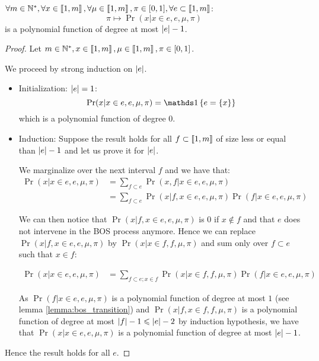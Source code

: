 \begin{lemma}
    \label{lemma:bos_polynomial}
    $\forall m \in \mathbb{N}^*, \forall x \in \left\llbracket1, m\right\rrbracket, \forall \mu \in \left\llbracket1, m\right\rrbracket, \pi \in [0, 1], \forall e \subset \left\llbracket1, m\right\rrbracket$:
    \[ \pi \mapsto \Pr(x | x \in e, e, \mu, \pi)\] 
    is a polynomial function of degree at most $\left|e\right| - 1$.
\end{lemma}
\begin{proof}
    Let $m \in \mathbb{N}^*, x \in \left\llbracket1, m\right\rrbracket, \mu \in \left\llbracket1, m\right\rrbracket, \pi \in [0, 1]$.

    We proceed by strong induction on $\left|e\right|$.
    \begin{itemize}
        \item Initialization: $\left|e\right| = 1$:
        \[ \Pr(x | x \in e, e, \mu, \pi) = \indickronecker{e = \set{x}} \] which is a polynomial function of degree $0$.
        
        \item Induction: Suppose the result holds for all $f \subset \left\llbracket1, m\right\rrbracket$ of size less or equal than $\left|e\right| - 1$ and let us prove it for $\left|e\right|$.
        
        We marginalize over the next interval $f$ and we have that:
        \begin{align}
            \Pr(x | x \in e, e, \mu, \pi) 
            &= \sum_{f \subset e} \Pr(x, f | x \in e, e, \mu, \pi) \\
            &= \sum_{f \subset e} \Pr(x | f, x \in e, e, \mu, \pi) \Pr(f | x \in e, e, \mu, \pi)
        \end{align}

        We can then notice that $\Pr(x | f, x \in e, e, \mu, \pi)$ is $0$ if $x \notin f$ and that $e$ does not intervene in the BOS process anymore. Hence we can replace $\Pr(x | f, x \in e, e, \mu, \pi)$ by $\Pr(x | x \in f, f, \mu, \pi)$ and sum only over $f \subset e$ such that $x \in f$:

        \begin{align}
            \Pr(x | x \in e, e, \mu, \pi) 
            &= \sum_{f \subset e ; x \in f} \Pr(x | x \in f, f, \mu, \pi) \Pr(f | x \in e, e, \mu, \pi)
        \end{align}

        As $\Pr(f | x \in e, e, \mu, \pi)$ is a polynomial function of degree at most $1$ (see lemma \ref{lemma:bos_transition}) and $\Pr(x | f, x \in f, f, \mu, \pi)$ is a polynomial function of degree at most $\left|f\right| - 1 \leqslant \left|e\right| - 2$ by induction hypothesis, we have that $\Pr(x | x \in e, e, \mu, \pi)$ is a polynomial function of degree at most $\left|e\right| - 1$.
    \end{itemize}

    Hence the result holds for all $e$.
\end{proof}


